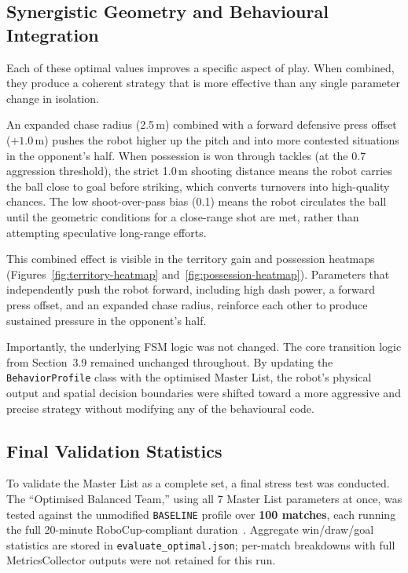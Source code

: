 \documentclass[12pt, a4paper]{report}
\begin{document}
\subsection{Synergistic Geometry and Behavioural Integration}

Each of these optimal values improves a specific aspect of play. When
combined, they produce a coherent strategy that is more effective than any
single parameter change in isolation.

An expanded chase radius (2.5\,m) combined with a forward defensive press
offset ($+1.0$\,m) pushes the robot higher up the pitch and into more
contested situations in the opponent's half.
When possession is won through tackles (at the 0.7 aggression threshold),
the strict 1.0\,m shooting distance means the robot carries the ball close
to goal before striking, which converts turnovers into high-quality
chances.
The low shoot-over-pass bias (0.1) means the robot circulates the ball
until the geometric conditions for a close-range shot are met, rather than
attempting speculative long-range efforts.

This combined effect is visible in the territory gain and possession
heatmaps (Figures~\ref{fig:territory-heatmap}
and~\ref{fig:possession-heatmap}).
Parameters that independently push the robot forward, including high dash
power, a forward press offset, and an expanded chase radius, reinforce each
other to produce sustained pressure in the opponent's half.

Importantly, the underlying FSM logic was not changed.
The core transition logic from Section~3.9 remained unchanged throughout.
By updating the \texttt{BehaviorProfile} class with the optimised Master
List, the robot's physical output and spatial decision boundaries were
shifted toward a more aggressive and precise strategy without modifying any
of the behavioural code.

\subsection{Final Validation Statistics}

To validate the Master List as a complete set, a final stress test was
conducted.
The ``Optimised Balanced Team,'' using all 7 Master List parameters at
once, was tested against the unmodified \texttt{BASELINE} profile over
\textbf{100 matches}, each running the full 20-minute RoboCup-compliant
duration~\cite{robocup2024}. Aggregate win/draw/goal statistics are stored
in \texttt{evaluate\_optimal.json}; per-match breakdowns with full
MetricsCollector outputs were not retained for this run.
\end{document}
